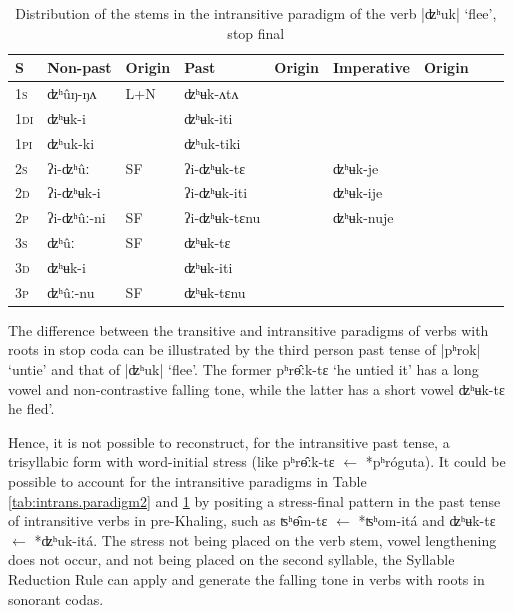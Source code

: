 \documentclass[oldfontcommands,oneside,a4paper,11pt]{article}
\newcommand{\ipa}[1]{{\phon \mbox{#1}}} %
\begin{document}
\begin{table}[h]
\caption{Distribution of the stems in the intransitive paradigm of the verb |\ipa{ʣʰuk}| `flee', stop final} \label{tab:intrans.paradigm3} \centering
\begin{tabular}{lllllllll}
\toprule
S & Non-past & Origin & Past & Origin & Imperative & Origin \\
\midrule
\textsc{1s} & \ipa{ʣʰûŋ-ŋʌ} &L+N & \ipa{ʣʰʉk-ʌtʌ} &\\
\textsc{1di} & \ipa{ʣʰʉk-i} && \ipa{ʣʰʉk-iti}& \\
\textsc{1pi} & \ipa{ʣʰuk-ki} && \ipa{ʣʰuk-tiki} &&\\
\textsc{2s} & \ipa{ʔi-ʣʰûː} &SF &\ipa{ʔi-ʣʰʉk-tɛ}  & &\ipa{ʣʰʉk-je}& \\
\textsc{2d} & \ipa{ʔi-ʣʰʉk-i}  & &\ipa{ʔi-ʣʰʉk-iti} &&\ipa{ʣʰʉk-ije} &\\
\textsc{2p} & \ipa{ʔi-ʣʰûː-ni} &SF& \ipa{ʔi-ʣʰʉk-tɛnu} & &\ipa{ʣʰʉk-nuje}& \\
\textsc{3s} & \ipa{ʣʰûː} & SF&\ipa{ʣʰʉk-tɛ} & \\
\textsc{3d} & \ipa{ʣʰʉk-i} & &\ipa{ʣʰʉk-iti} &\\
\textsc{3p} & \ipa{ʣʰûː-nu} &SF& \ipa{ʣʰʉk-tɛnu} & \\
\bottomrule
\end{tabular}
\end{table}

The difference between the transitive and intransitive paradigms of verbs with roots in stop coda can be illustrated by the third person past tense of |\ipa{pʰrok}| `untie' and that of |\ipa{ʣʰuk}| `flee'. The former \ipa{pʰrɵ̂ːk-tɛ} `he untied it' has a long vowel and non-contrastive falling tone, while the latter has a short vowel \ipa{ʣʰʉk-tɛ}  he fled'.

Hence, it is not possible to reconstruct, for the intransitive past tense, a trisyllabic form with word-initial stress (like  \ipa{pʰrɵ̂ːk-tɛ} $\leftarrow$ \ipa{*pʰróguta}). It could be possible to account for the intransitive paradigms in Table \ref{tab:intrans.paradigm2} and \ref{tab:intrans.paradigm3} by positing a stress-final pattern in the past tense of intransitive verbs in pre-Khaling, such as \ipa{ʦʰɵ̂m-tɛ} $\leftarrow$  \ipa{*ʦʰom-itá} and \ipa{ʣʰʉk-tɛ} $\leftarrow$ \ipa{*ʣʰuk-itá}.  The stress not being placed on the verb stem, vowel lengthening does not occur, and not being placed on the second syllable, the Syllable Reduction Rule can apply and generate the falling tone in verbs with roots in sonorant codas.
\end{document}
